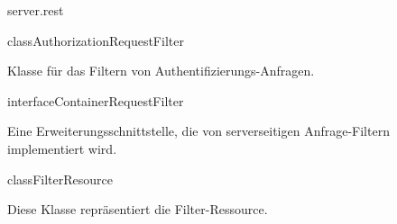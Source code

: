 \begin{texdocpackage}{server.rest}
\label{texdoclet:edu.kit.informatik.studyplan.server.rest}

\begin{texdocclass}{class}{AuthorizationRequestFilter}
\label{texdoclet:edu.kit.informatik.studyplan.server.rest.AuthorizationRequestFilter}
\begin{texdocclassintro}
Klasse für das Filtern von Authentifizierungs-Anfragen.\end{texdocclassintro}
\begin{texdocclassconstructors}
\end{texdocclassconstructors}
\begin{texdocclassmethods}
\end{texdocclassmethods}
\end{texdocclass}


\begin{texdocclass}{interface}{ContainerRequestFilter}
\label{texdoclet:edu.kit.informatik.studyplan.server.rest.ContainerRequestFilter}
\begin{texdocclassintro}
Eine Erweiterungsschnittstelle, die von serverseitigen Anfrage-Filtern implementiert wird.\end{texdocclassintro}
\begin{texdocclassmethods}
\end{texdocclassmethods}
\end{texdocclass}


\begin{texdocclass}{class}{FilterResource}
\label{texdoclet:edu.kit.informatik.studyplan.server.rest.FilterResource}
\begin{texdocclassintro}
Diese Klasse repräsentiert die Filter-Ressource.\end{texdocclassintro}
\begin{texdocclassconstructors}
\end{texdocclassconstructors}
\begin{texdocclassmethods}
\end{texdocclassmethods}
\end{texdocclass}



\end{texdocpackage}

